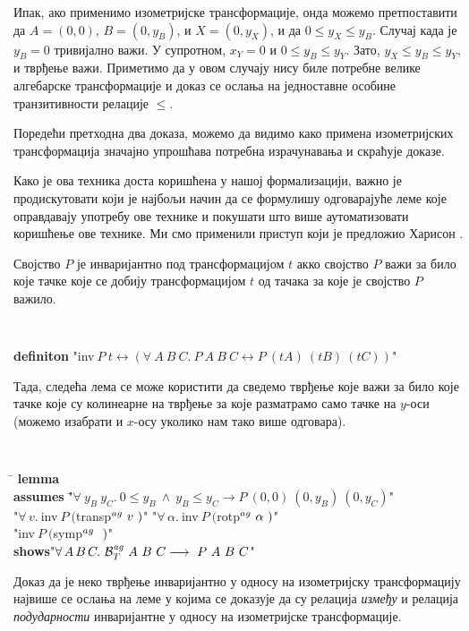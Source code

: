 Ипак, ако применимо изометријске трансформације, онда можемо
претпоставити да $A=(0, 0)$, $B=(0, y_B)$, и $X=(0, y_X)$, и да $0 \le
y_X \le y_B$. Случај када је $y_B = 0$ тривијално важи. У супротном,
$x_Y = 0$ и $0 \le y_B \le y_Y$. Зато, $y_X \le y_B \le y_Y$, и
тврђење важи. Приметимо да у овом случају нису биле потребне велике
алгебарске трансформације и доказ се ослања на једноставне особине
транзитивности релације $\le$.

Поредећи претходна два доказа, можемо да видимо како примена
изометријских трансформација значајно упрошћава потребна израчунавања
и скраћује доказе.

Како је ова техника доста коришћена у нашој формализацији, важно је
продискутовати који је најбољи начин да се формулишу одговарајуће леме
које оправдавају употребу ове технике и покушати што више
аутоматизовати коришћење ове технике. Ми смо применили приступ који је
предложио Харисон \cite{wlog}.

Својство $P$ је инваријантно под трансформацијом $t$ акко својство $P$
важи за било које тачке које се добију трансформацијом $t$ од тачака
за које је својство $P$ важило.
{\tt
\begin{tabbing}
\textbf{definiton} "inv$\ P\ t \longleftrightarrow (\forall\ A\ B\ C.\ P\ A\ B\ C
\longleftrightarrow P\ (t A)\ (t B)\ (t C))$"
\end{tabbing}
}
Тада, следећа лема се може користити да сведемо тврђење које важи за
било које тачке које су колинеарне на тврђење за које разматрамо само
тачке на $y$-оси (можемо изабрати и $x$-осу уколико нам тако више
одговара).
{\tt
\begin{tabbing}
\hspace{5mm}\=\kill
\textbf{lemma}\\
\>\textbf{assumes} \="$\forall\ y_B\ y_C.\ 0 \le y_B \ \wedge\  y_B \le y_C \longrightarrow P\ (0, 0)\ (0, y_B)\ (0, y_C)$"\\
\>\>       "$\forall\,v.\ $inv$\ P\ ($transp$^{ag}\ v\ )$" "$\forall\,\alpha.\ $inv$\ P\ ($rotp$^{ag}\ \alpha\ )$"\\
\>\>       "inv$\ P\ ($symp$^{ag}\ \ )$"\\
\>\textbf{shows}\>"$\forall\,A\,B\,C.\ \agbett{A}{B}{C} \longrightarrow\ P\ A\ B\ C$"
\end{tabbing}
}  Доказ да је неко тврђење инваријантно у
односу на изометријску трансформацију највише се ослања на леме у
којима се доказује да су релација \emph{између} и релација
\emph{подударности} инваријантне у односу на изометријске
трансформације.

